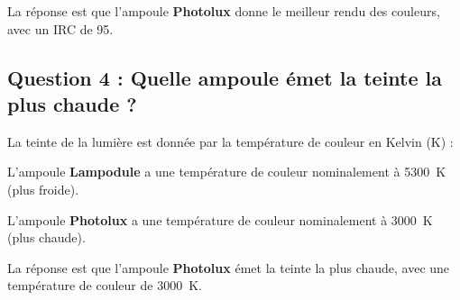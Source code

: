 \documentclass[answers]{exam}
\begin{document}
\begin{solution}
\begin{questions}
La réponse est que l'ampoule \textbf{Photolux} donne le meilleur rendu des couleurs, avec un IRC de \num{95}.

\subsection*{Question 4 : Quelle ampoule émet la teinte la plus chaude ?}

La teinte de la lumière est donnée par la température de couleur en Kelvin (K) :
\begin{compactitem}
    \item L'ampoule \textbf{Lampodule} a une température de couleur nominalement à \SI{5300}{K} (plus froide).
    \item L'ampoule \textbf{Photolux} a une température de couleur nominalement à \SI{3000}{K} (plus chaude).
\end{compactitem}

La réponse est que l'ampoule \textbf{Photolux} émet la teinte la plus chaude, avec une température de couleur de \SI{3000}{K}.

\end{questions}
\end{solution}
\end{document}
